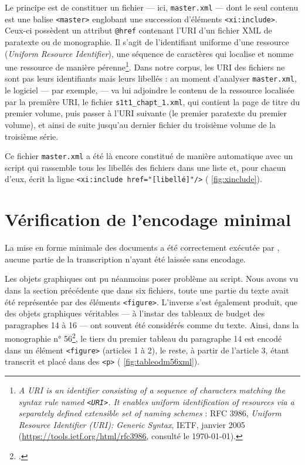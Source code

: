 Le principe est de constituer un fichier --- ici, \texttt{master.xml} --- dont le seul contenu est une balise \texttt{<master>} englobant une succession d'éléments \texttt{<xi:include>}. Ceux-ci possèdent un attribut \texttt{@href} contenant l'URI d'un fichier XML de paratexte ou de monographie. Il s'agit de l'identifiant uniforme d'une ressource (\textit{Uniform Resource Identifier}), \cad{} une séquence de caractères qui localise et nomme une ressource de manière pérenne\footnote{\og \textit{A URI is an identifier consisting of a sequence of characters matching the syntax rule named \texttt{<URI>}. It enables uniform identification of resources via a separately defined extensible set of naming schemes} \fg{} : RFC 3986, \textit{Uniform Resource Identifier (URI): Generic Syntax}, IETF, janvier 2005 (\url{https://tools.ietf.org/html/rfc3986}, consulté le \today).}. Dans notre corpus, les URI des fichiers ne sont pas leurs identifiants mais leurs libellés : au moment d'analyser \texttt{master.xml}, le logiciel --- par exemple, \oxygen{} --- va lui adjoindre le contenu de la ressource localisée par la première URI, \cad{} le fichier \texttt{s1t1\_chapt\_1.xml}, qui contient la page de titre du premier volume, puis passer à l'URI suivante (le premier paratexte du premier volume), et ainsi de suite jusqu'au dernier fichier du troisième volume de la troisième série.

Ce fichier \texttt{master.xml} a été là encore constitué de manière automatique avec un script qui rassemble tous les libellés des fichiers dans une liste et, pour chacun d'eux, écrit la ligne \texttt{<xi:include href="[libellé]"/>} (\fig{} \ref{fig:xinclude}).

\section{Vérification de l'encodage minimal}

La mise en forme minimale des documents a été correctement exécutée par \lse, aucune partie de la transcription n'ayant été laissée sans encodage.

Les objets graphiques ont pu néanmoins poser problème au script. Nous avons vu dans la section précédente que dans six fichiers, toute une partie du texte avait été représentée par des éléments \texttt{<figure>}. L'inverse s'est également produit, \cad{} que des objets graphiques véritables --- à l'instar des tableaux de budget des paragraphes 14 à 16 --- ont souvent été considérés comme du texte. Ainsi, dans la monographie n° 56\footcite{mono056a}, le tiers du premier tableau du paragraphe 14 est encodé dans un élément \texttt{<figure>} (articles 1 à 2), le reste, à partir de l'article 3, étant transcrit et placé dans des \texttt{<p>} (\fig{} \ref{fig:tableodm56xml}).

